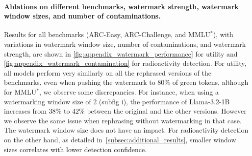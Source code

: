 \paragraph{\textbf{Ablations on different benchmarks, watermark strength, watermark window sizes, and number of contaminations.}} Results for all benchmarks (ARC-Easy, ARC-Challenge, and MMLU$^*$), with variations in watermark window size, number of contaminations, and watermark strength, are shown in \autoref{fig:appendix_watermark_performance} for utility and \autoref{fig:appendix_watermark_contamination} for radioactivity detection.
For utility, all models perform very similarly on all the rephrased versions of the benchmarks, even when pushing the watermark to $80\%$ of green tokens, although for MMLU$^*$, we observe some discrepancies. 
For instance, when using a watermarking window size of 2 (subfig i), the performance of Llama-3.2-1B increases from 38$\%$ to $42\%$ between the original and the other versions. 
However we observe the same issue when rephrasing without watermarking in that case.
The watermark window size does not have an impact.
For radioactivity detection on the other hand, as detailed in~\autoref{subsec:additional_results}, smaller window sizes correlates with lower detection confidence.




